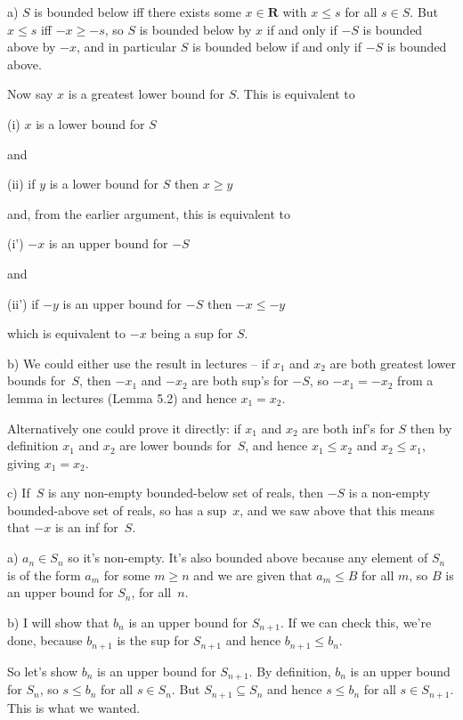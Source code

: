 \documentclass[10pt]{article}
\newcommand{\R}{\mathbf{R}}
\begin{document}
\medskip{} 

a) $S$ is bounded below iff there exists some $x\in\R$ with $x\leq s$ for all $s\in S$. But $x\leq s$ iff $-x\geq -s$, so $S$ is bounded below by $x$ if and only if  $-S$ is bounded above by $-x$, and in particular $S$ is bounded below if and only if $-S$ is bounded above.

Now say $x$ is a greatest lower bound for $S$. This is equivalent to 

(i) $x$ is a lower bound for $S$

and

(ii) if $y$ is a lower bound for $S$ then $x\geq y$

and, from the earlier argument, this is equivalent to 

(i') $-x$ is an upper bound for $-S$

and

(ii') if $-y$ is an upper bound for $-S$ then $-x\leq -y$

which is equivalent to $-x$ being a sup for $S$.

b) We could either use the result in lectures -- if $x_1$ and $x_2$ are both greatest lower bounds for~$S$, then $-x_1$ and $-x_2$ are both sup's for $-S$, so $-x_1=-x_2$ from a lemma in lectures (Lemma 5.2) and hence $x_1=x_2$.

Alternatively one could prove it directly: if $x_1$ and $x_2$ are both inf's for $S$ then by definition $x_1$ and $x_2$ are lower bounds for~$S$, and hence $x_1\leq x_2$ and $x_2\leq x_1$, giving $x_1=x_2$.

c) If~$S$ is any non-empty bounded-below set of reals, then $-S$ is a non-empty bounded-above set of reals, so has a sup~$x$, and we saw above that this means that $-x$ is an inf for~$S$.

\medskip{} 

a) $a_n\in S_n$ so it's non-empty. It's also bounded above because any element of $S_n$ is of the form $a_m$ for some $m\geq n$ and we are given that $a_m\leq B$ for all $m$, so $B$ is an upper bound for $S_n$, for all~$n$.

b) I will show that $b_n$ is an upper bound for $S_{n+1}$. If we can check this, we're done, because $b_{n+1}$ is the sup for $S_{n+1}$ and hence $b_{n+1}\leq b_n$.

So let's show $b_n$ is an upper bound for $S_{n+1}$. By definition, $b_n$ is an upper bound for $S_n$, so $s\leq b_n$ for all $s\in S_n$. But $S_{n+1}\subseteq S_n$ and hence $s\leq b_n$ for all $s\in S_{n+1}$. This is what we wanted.
\end{document}
